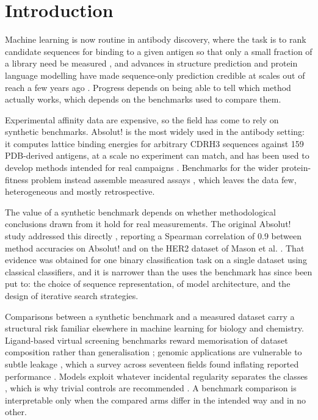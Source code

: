 \documentclass[pdflatex,sn-nature]{sn-jnl}
\theoremstyle{thmstyleone}
\theoremstyle{thmstyletwo}
\theoremstyle{thmstylethree}
\begin{document}
\section*{Introduction}\label{sec:intro}

Machine learning is now routine in antibody discovery, where the task is to
rank candidate sequences for binding to a given antigen so that only a small
fraction of a library need be measured \cite{mason2021,hie2024}, and advances
in structure prediction and protein language modelling have made sequence-only
prediction credible at scales out of reach a few years ago
\cite{jumper2021,rives2021,ruffolo2023}. Progress depends on being able to tell
which method actually works, which depends on the benchmarks used to compare
them.

Experimental affinity data are expensive, so the field has come to rely on
synthetic benchmarks. Absolut! \cite{robert2022} is the most widely used in the
antibody setting: it computes lattice binding energies for arbitrary CDRH3
sequences against 159 PDB-derived antigens, at a scale no experiment can match,
and has been used to develop methods intended for real campaigns
\cite{akbar2022,khan2023}. Benchmarks for the wider protein-fitness problem
instead assemble measured assays \cite{rao2019,dallago2021,notin2023}, which
leaves the data few, heterogeneous and mostly retrospective.

The value of a synthetic benchmark depends on whether methodological
conclusions drawn from it hold for real measurements. The original Absolut!
study addressed this directly \cite{robert2022}, reporting a Spearman
correlation of 0.9 between method accuracies on Absolut! and on the HER2
dataset of Mason et al. \cite{mason2021}. That evidence was obtained for one
binary classification task on a single dataset using classical classifiers, and
it is narrower than the uses the benchmark has since been put to: the choice of
sequence representation, of model architecture, and the design of iterative
search strategies.

Comparisons between a synthetic benchmark and a measured dataset carry a
structural risk familiar elsewhere in machine learning for biology and
chemistry. Ligand-based virtual screening benchmarks reward memorisation of
dataset composition rather than generalisation \cite{wallach2018,sieg2019};
genomic applications are vulnerable to subtle leakage \cite{whalen2022}, which
a survey across seventeen fields found inflating reported performance
\cite{kapoor2023}. Models exploit whatever incidental regularity separates the
classes \cite{geirhos2020}, which is why trivial controls are recommended
\cite{chuang2018,walsh2021}. A benchmark comparison is interpretable only when
the compared arms differ in the intended way and in no other.
\end{document}
